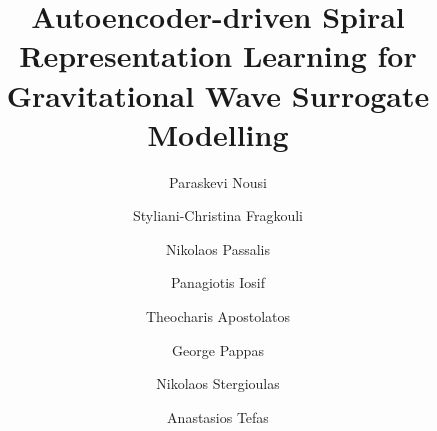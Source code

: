 \documentclass[preprint,12pt]{elsarticle}
\begin{document}
\begin{frontmatter}



\title{Autoencoder-driven Spiral Representation Learning for Gravitational Wave Surrogate Modelling}


\author[inst1]{Paraskevi Nousi}

            
\author[inst1]{Styliani-Christina Fragkouli}

\author[inst1]{Nikolaos Passalis}

\author[inst3]{Panagiotis Iosif}

\author[inst2]{Theocharis Apostolatos}

\author[inst3]{George Pappas}

\author[inst3]{Nikolaos Stergioulas}

\author[inst1]{Anastasios Tefas}


            

\end{frontmatter}
\end{document}
